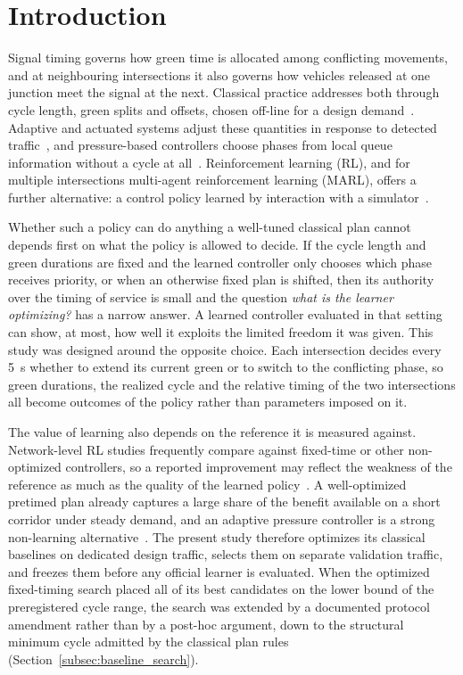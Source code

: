 \documentclass[review,12pt]{elsarticle}
\begin{document}
\section{Introduction}
\label{sec:introduction}

Signal timing governs how green time is allocated among conflicting
movements, and at neighbouring intersections it also governs how
vehicles released at one junction meet the signal at the next. Classical
practice addresses both through cycle length, green splits and offsets,
chosen off-line for a design demand~\cite{webster1958,robertson1969transyt,little1981maxband,gartner1990multiband}.
Adaptive and actuated systems adjust these quantities in response to
detected traffic~\cite{hunt1981traffic,sims1980scoot}, and pressure-based
controllers choose phases from local queue information without a cycle
at all~\cite{varaiya2013max}. Reinforcement learning (RL), and for
multiple intersections multi-agent reinforcement learning (MARL), offers
a further alternative: a control policy learned by interaction with a
simulator~\cite{wei2018intellilight,chu2019multi,noaeen2022reinforcement}.

Whether such a policy can do anything a well-tuned classical plan
cannot depends first on what the policy is allowed to decide. If the
cycle length and green durations are fixed and the learned controller
only chooses which phase receives priority, or when an otherwise fixed
plan is shifted, then its authority over the timing of service is small
and the question \emph{what is the learner optimizing?} has a narrow
answer. A learned controller evaluated in that setting can show, at
most, how well it exploits the limited freedom it was given. This study
was designed around the opposite choice. Each intersection decides every
5~s whether to extend its current green or to switch to the conflicting
phase, so green durations, the realized cycle and the relative timing
of the two intersections all become outcomes of the policy rather than
parameters imposed on it.

The value of learning also depends on the reference it is measured
against. Network-level RL studies frequently compare against fixed-time
or other non-optimized controllers, so a reported improvement may
reflect the weakness of the reference as much as the quality of the
learned
policy~\cite{noaeen2022reinforcement}. A well-optimized pretimed plan
already captures a large share of the benefit available on a short
corridor under steady demand, and an adaptive pressure controller is a
strong non-learning alternative~\cite{varaiya2013max,levin2020max}. The
present study therefore optimizes its classical baselines on dedicated
design traffic, selects them on separate validation traffic, and freezes
them before any official learner is evaluated. When the optimized
fixed-timing search placed all of its best candidates on the lower
bound of the preregistered cycle range, the search was extended by a
documented protocol amendment rather than by a post-hoc argument, down
to the structural minimum cycle admitted by the classical plan rules
(Section~\ref{subsec:baseline_search}).
\end{document}

